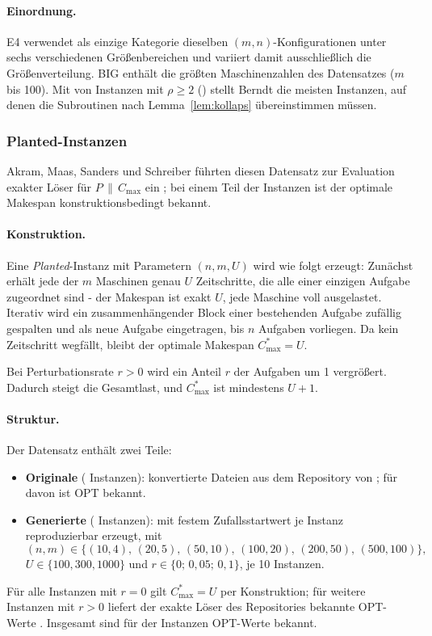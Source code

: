 \paragraph{Einordnung.}
E4 verwendet als einzige Kategorie dieselben $(m,n)$-Konfigurationen unter sechs
verschiedenen Größenbereichen und variiert damit ausschließlich die Größenverteilung.
BIG enthält die größten Maschinenzahlen des Datensatzes ($m$ bis 100).
Mit \EvalRhoZweiBerndt{} von \EvalInstanzenBerndt{} Instanzen mit $\rho \ge 2$
(\EvalRhoZweiAnteilBerndt) stellt Berndt die meisten
Instanzen, auf denen die Subroutinen nach Lemma~\ref{lem:kollaps} übereinstimmen müssen.

\subsubsection{Planted-Instanzen}
\label{sub:bench-planted}

Akram, Maas, Sanders und Schreiber führten diesen Datensatz zur Evaluation exakter
Löser für $P\,\|\,C_{\max}$ ein \cite{akram2025}; bei einem Teil der Instanzen ist der optimale
Makespan konstruktionsbedingt bekannt.

\paragraph{Konstruktion.}
Eine \emph{Planted}-Instanz mit Parametern $(n,m,U)$ wird wie folgt erzeugt:
Zunächst erhält jede der $m$ Maschinen genau $U$ Zeitschritte, die alle einer einzigen
Aufgabe zugeordnet sind - der Makespan ist exakt $U$, jede Maschine voll ausgelastet.
Iterativ wird ein zusammenhängender Block einer bestehenden Aufgabe zufällig gespalten
und als neue Aufgabe eingetragen, bis $n$ Aufgaben vorliegen.
Da kein Zeitschritt wegfällt, bleibt der optimale Makespan $C^{*}_{\max} = U$.

Bei Perturbationsrate $r > 0$ wird ein Anteil $r$ der Aufgaben um 1 vergrößert.
Dadurch steigt die Gesamtlast, und $C^{*}_{\max}$ ist mindestens $U+1$.

\paragraph{Struktur.}
Der Datensatz enthält zwei Teile:
\begin{itemize}[nosep]
  \item \textbf{Originale} (\EvalPlantedOriginale{} Instanzen): konvertierte Dateien aus dem
    Repository von \textcite{akram2025}; für \EvalPlantedOriginaleOpt{} davon ist OPT bekannt.
  \item \textbf{Generierte} (\EvalPlantedGeneriert{} Instanzen): mit festem Zufallsstartwert je
    Instanz reproduzierbar erzeugt, mit
    \[
      (n,m) \in \{(10,4),\,(20,5),\,(50,10),\,(100,20),\,(200,50),\,(500,100)\},
    \]
    $U \in \{100,300,1000\}$ und $r \in \{0;\, 0{,}05;\, 0{,}1\}$, je 10 Instanzen.
\end{itemize}
Für alle \EvalPlantedRNull{} Instanzen mit $r=0$ gilt $C^{*}_{\max}=U$ per Konstruktion;
für weitere \EvalPlantedRPositiv{} Instanzen mit $r>0$ liefert der exakte Löser des Repositories
bekannte OPT-Werte \cite{akram2025}.
Insgesamt sind für \EvalOptBekanntPlanted{} der \EvalInstanzenPlanted{} Instanzen OPT-Werte
bekannt.

